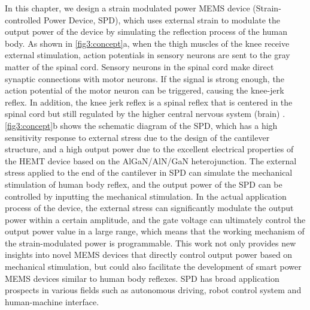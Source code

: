 In this chapter, we design a  strain modulated power MEMS  device  (Strain-controlled Power Device, SPD), which uses external strain to modulate the output power of the device by simulating the reflection process of the human body. As shown in \autoref{fig3:concept}a, when the thigh muscles of the knee receive external stimulation, action potentials in sensory neurons are sent to the gray matter of the spinal cord. Sensory neurons in the spinal cord make direct synaptic connections with motor neurons. If the signal is strong enough, the action potential of the motor neuron can be triggered, causing the knee-jerk reflex. In addition, the knee jerk reflex is a spinal reflex that is centered in the spinal cord but still regulated by the higher central nervous system (brain) \cite{daroff2014encyclopedia}. \autoref{fig3:concept}b shows the schematic diagram of the SPD, which has a high sensitivity response to external stress due to the design of the cantilever structure, and a high output power  due to the excellent electrical properties of the HEMT device based on the AlGaN/AlN/GaN heterojunction. The external stress applied to the end of the cantilever in SPD can simulate the mechanical stimulation of human body reflex, and the output power of the SPD can be controlled by inputting the mechanical stimulation. In the actual application process of the device, the external stress can significantly modulate the output power within a certain amplitude, and the gate voltage  can ultimately control the output power value in a large range, which means that the working mechanism of the strain-modulated power is programmable. This work not only provides new insights into novel MEMS devices that directly control output power based on mechanical stimulation, but could also facilitate the development of smart power MEMS devices similar to human body reflexes. SPD  has broad application prospects in various fields such as autonomous driving, robot control system and human-machine interface.

